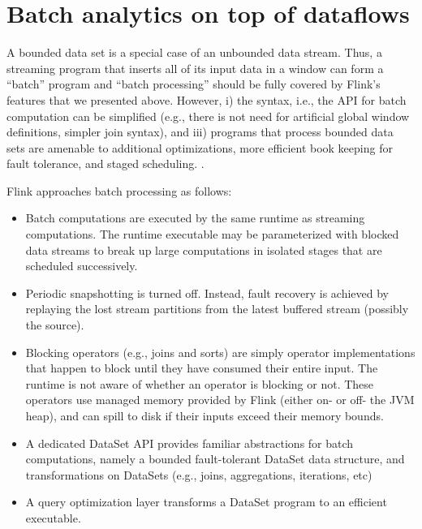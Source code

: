 
\section{Batch analytics on top of dataflows}
\label{sec:batch}



A bounded data set is a special case of an unbounded data stream. Thus, a streaming program that inserts all of its input data in a window can form a “batch” program and “batch processing” should be fully covered by Flink’s features that we presented above. However, i) the syntax, i.e., the API for batch computation can be simplified (e.g., there is not need for artificial global window definitions, simpler join syntax), and iii) programs that process bounded data sets are amenable to additional optimizations, more efficient book keeping for fault tolerance, and staged scheduling. .

\vspace{2mm}
\noindent Flink approaches batch processing as follows:
\begin{itemize}
	\item Batch computations are executed by the same runtime as streaming computations. The runtime executable may be parameterized with blocked data streams to break up large computations in isolated stages that are scheduled successively.
	\item Periodic snapshotting is turned off. Instead, fault recovery is achieved by replaying the lost stream partitions from the latest buffered stream (possibly the source).
	\item Blocking operators (e.g., joins and sorts) are simply operator implementations that happen to block until they have consumed their entire input. The runtime is not aware of whether an operator is blocking or not. These operators use managed memory provided by Flink (either on- or off- the JVM heap), and can spill to disk if their inputs exceed their memory bounds.
	\item A dedicated DataSet API provides familiar abstractions for batch computations, namely a bounded fault-tolerant DataSet data structure, and transformations on DataSets (e.g., joins, aggregations, iterations, etc)
	\item A query optimization layer transforms a DataSet program to an efficient executable.
\end{itemize}



